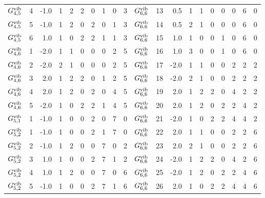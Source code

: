 \begin{tabular}{crrrrrrrrcrrrrrrrr}
    $ G^{\rm vib}_{  4, 5}  $& 4 & -1.0 & 1 & 2 & 2 & 0 & 1 & 0 & 3 &     $    G^{\rm vib}_{ 6, 6}  $&  13 &  0.5 & 1 & 1 & 0 & 0 & 0 & 6 & 0\\
    $ G^{\rm vib}_{  4, 5}  $& 5 & -1.0 & 1 & 2 & 0 & 2 & 0 & 1 & 3 &     $    G^{\rm vib}_{ 6, 6}  $&  14 &  0.5 & 2 & 1 & 0 & 0 & 0 & 6 & 0\\
    $ G^{\rm vib}_{  4, 5}  $& 6 &  1.0 & 1 & 0 & 2 & 2 & 1 & 1 & 3 &     $    G^{\rm vib}_{ 6, 6}  $&  15 &  1.0 & 1 & 0 & 0 & 1 & 0 & 6 & 0\\
    $ G^{\rm vib}_{  4, 6}  $& 1 & -2.0 & 1 & 1 & 0 & 0 & 0 & 2 & 5 &     $    G^{\rm vib}_{ 6, 6}  $&  16 &  1.0 & 3 & 0 & 0 & 1 & 0 & 6 & 0\\
    $ G^{\rm vib}_{  4, 6}  $& 2 & -2.0 & 2 & 1 & 0 & 0 & 0 & 2 & 5 &     $    G^{\rm vib}_{ 6, 6}  $&  17 & -2.0 & 1 & 1 & 0 & 0 & 2 & 2 & 2\\
    $ G^{\rm vib}_{  4, 6}  $& 3 &  2.0 & 1 & 2 & 2 & 0 & 1 & 2 & 5 &     $    G^{\rm vib}_{ 6, 6}  $&  18 & -2.0 & 2 & 1 & 0 & 0 & 2 & 2 & 2\\
    $ G^{\rm vib}_{  4, 6}  $& 4 &  2.0 & 1 & 2 & 0 & 2 & 0 & 4 & 5 &     $    G^{\rm vib}_{ 6, 6}  $&  19 &  2.0 & 1 & 2 & 2 & 0 & 4 & 2 & 2\\
    $ G^{\rm vib}_{  4, 6}  $& 5 & -2.0 & 1 & 0 & 2 & 2 & 1 & 4 & 5 &     $    G^{\rm vib}_{ 6, 6}  $&  20 &  2.0 & 1 & 2 & 0 & 2 & 2 & 4 & 2\\
    $ G^{\rm vib}_{  5, 1}  $& 1 & -1.0 & 1 & 0 & 0 & 2 & 0 & 7 & 0 &     $    G^{\rm vib}_{ 6, 6}  $&  21 & -2.0 & 1 & 0 & 2 & 2 & 4 & 4 & 2\\
    $ G^{\rm vib}_{  5, 2}  $& 1 & -1.0 & 1 & 0 & 0 & 2 & 1 & 7 & 0 &     $    G^{\rm vib}_{ 6, 6}  $&  22 &  2.0 & 1 & 1 & 0 & 0 & 2 & 2 & 6\\
    $ G^{\rm vib}_{  5, 2}  $& 2 & -1.0 & 1 & 2 & 0 & 0 & 7 & 0 & 2 &     $    G^{\rm vib}_{ 6, 6}  $&  23 &  2.0 & 2 & 1 & 0 & 0 & 2 & 2 & 6\\
    $ G^{\rm vib}_{  5, 2}  $& 3 &  1.0 & 1 & 0 & 0 & 2 & 7 & 1 & 2 &     $    G^{\rm vib}_{ 6, 6}  $&  24 & -2.0 & 1 & 2 & 2 & 0 & 4 & 2 & 6\\
    $ G^{\rm vib}_{  5, 2}  $& 4 &  1.0 & 1 & 2 & 0 & 0 & 7 & 0 & 6 &     $    G^{\rm vib}_{ 6, 6}  $&  25 & -2.0 & 1 & 2 & 0 & 2 & 2 & 4 & 6\\
    $ G^{\rm vib}_{  5, 2}  $& 5 & -1.0 & 1 & 0 & 0 & 2 & 7 & 1 & 6 &     $    G^{\rm vib}_{ 6, 6}  $&  26 &  2.0 & 1 & 0 & 2 & 2 & 4 & 4 & 6\\
    \hline
    \hline
        \end{tabular}

